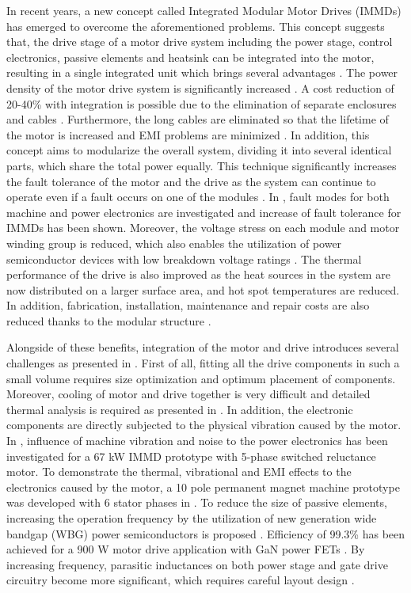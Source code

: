 \documentclass[conference,a4paper,twocolumn]{IEEEtran}
\begin{document}
In recent years, a new concept called Integrated Modular Motor Drives (IMMDs) has emerged to overcome the aforementioned problems. This concept suggests that, the drive stage of a motor drive system including the power stage, control electronics, passive elements and heatsink can be integrated into the motor, resulting in a single integrated unit which brings several advantages \cite{LoCalzo2016}. The power density of the motor drive system is significantly increased \cite{Lambert2015a,Wang2013}. A cost reduction of 20-40\% with integration is possible due to the elimination of separate enclosures and cables \cite{LoCalzo2016}. Furthermore, the long cables are eliminated so that the lifetime of the motor is increased and EMI problems are minimized \cite{Wolmarans2008}. In addition, this concept aims to modularize the overall system, dividing it into several identical parts, which share the total power equally. This technique significantly increases the fault tolerance of the motor and the drive as the system can continue to operate even if a fault occurs on one of the modules \cite{Hennen2012,Galassini2015,Wang2013}. In \cite{Wolmarans2008}, fault modes for both machine and power electronics are investigated and increase of fault tolerance for IMMDs has been shown. Moreover, the voltage stress on each module and motor winding group is reduced, which also enables the utilization of power semiconductor devices with low breakdown voltage ratings \cite{Wang2014,Wang2015b}. The thermal performance of the drive is also improved as the heat sources in the system are now distributed on a larger surface area, and hot spot temperatures are reduced. In addition, fabrication, installation, maintenance and repair costs are also reduced thanks to the modular structure \cite{LoCalzo2016,Hennen2012,Lambert2015a,Jahns2014}.

Alongside of these benefits, integration of the motor and drive introduces several challenges as presented in \cite{LoCalzo2016,Wang2015b}. First of all, fitting all the drive components in such a small volume requires size optimization and optimum placement of components. Moreover, cooling of motor and drive together is very difficult and detailed thermal analysis is required as presented in \cite{Lambert2015a}. In addition, the electronic components are directly subjected to the physical vibration caused by the motor. In \cite{Hennen2012}, influence of machine vibration and noise to the power electronics has been investigated for a 67 kW IMMD prototype with 5-phase switched reluctance motor. To demonstrate the thermal, vibrational and EMI effects to the electronics caused by the motor, a 10 pole permanent magnet machine prototype was developed with 6 stator phases in \cite{Jahns2014}. To reduce the size of passive elements, increasing the operation frequency by the utilization of new generation wide bandgap (WBG) power semiconductors is proposed \cite{Lambert2015a,Wang2015b}. Efficiency of 99.3\% has been achieved for a 900 W motor drive application with GaN power FETs \cite{Morita2011}. By increasing frequency, parasitic inductances on both power stage and gate drive circuitry become more significant, which requires careful layout design \cite{LoCalzo2016}. 
\end{document}

